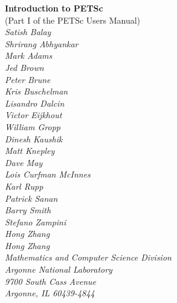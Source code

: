 %
%
%
%


\def\design{\medskip \noindent Design Issue:\begin{em}}
\def\enddesign{\end{em} \medskip}


\def\shortintro{*}
\renewcommand{\cite}[1]{}
\def\thesection {$\!\!\!\!$}

\usepackage{fancyhdr,lastpage}
\pagestyle{fancy}



\begin{center}
$\!$
\vspace{1.0cm}
\thispagestyle{empty}

{\huge \bf Introduction to PETSc}\\
\vspace{0.5cm}
{\LARGE (Part I of the PETSc Users Manual)} \\
\vspace{1.5cm}
{\large \em Satish Balay\\Shrirang Abhyankar\\Mark Adams\\Jed Brown\\Peter Brune\\Kris Buschelman\\Lisandro Dalcin\\Victor Eijkhout\\William Gropp\\Dinesh Kaushik\\Matt Knepley\\Dave May\\Lois Curfman McInnes\\Karl Rupp\\Patrick Sanan\\Barry Smith\\Stefano Zampini\\Hong Zhang\\Hong Zhang\\
\medskip \medskip
Mathematics and Computer Science Division\\
Argonne National Laboratory\\
9700 South Cass Avenue\\
Argonne, IL 60439-4844\\
}
\end{center}

